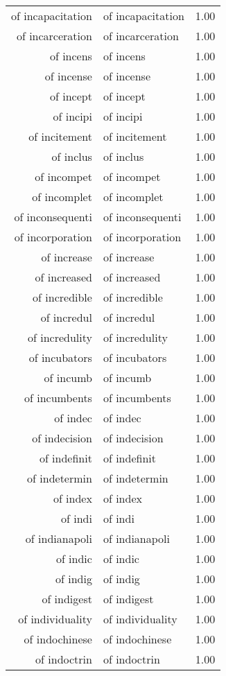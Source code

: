 \begin{table}[ht]
\begin{tabular}{rlr}
  of incapacitation & of incapacitation & 1.00 \\ 
  of incarceration & of incarceration & 1.00 \\ 
  of incens & of incens & 1.00 \\ 
  of incense & of incense & 1.00 \\ 
  of incept & of incept & 1.00 \\ 
  of incipi & of incipi & 1.00 \\ 
  of incitement & of incitement & 1.00 \\ 
  of inclus & of inclus & 1.00 \\ 
  of incompet & of incompet & 1.00 \\ 
  of incomplet & of incomplet & 1.00 \\ 
  of inconsequenti & of inconsequenti & 1.00 \\ 
  of incorporation & of incorporation & 1.00 \\ 
  of increase & of increase & 1.00 \\ 
  of increased & of increased & 1.00 \\ 
  of incredible & of incredible & 1.00 \\ 
  of incredul & of incredul & 1.00 \\ 
  of incredulity & of incredulity & 1.00 \\ 
  of incubators & of incubators & 1.00 \\ 
  of incumb & of incumb & 1.00 \\ 
  of incumbents & of incumbents & 1.00 \\ 
  of indec & of indec & 1.00 \\ 
  of indecision & of indecision & 1.00 \\ 
  of indefinit & of indefinit & 1.00 \\ 
  of indetermin & of indetermin & 1.00 \\ 
  of index & of index & 1.00 \\ 
  of indi & of indi & 1.00 \\ 
  of indianapoli & of indianapoli & 1.00 \\ 
  of indic & of indic & 1.00 \\ 
  of indig & of indig & 1.00 \\ 
  of indigest & of indigest & 1.00 \\ 
  of individuality & of individuality & 1.00 \\ 
  of indochinese & of indochinese & 1.00 \\ 
  of indoctrin & of indoctrin & 1.00 \\ 

\end{tabular}
\end{table}
